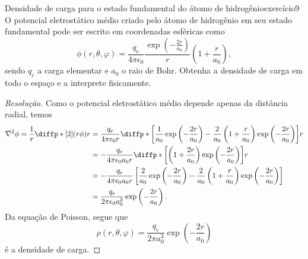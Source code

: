 \begin{exercício}{Densidade de carga para o estado fundamental do átomo de hidrogênio}{exercício9}
    O potencial eletrostático médio criado pelo átomo de hidrogênio em seu estado fundamental pode ser escrito em coordenadas esféricas como
    \begin{equation*}
        \phi(r, \theta, \varphi) = \frac{q_e}{4\pi \epsilon_0} \frac{\exp\left(-\frac{2r}{a_0}\right)}{r} \left(1 + \frac{r}{a_0}\right),
    \end{equation*}
    sendo \(q_e\) a carga elementar e \(a_0\) o raio de Bohr. Obtenha a densidade de carga em todo o espaço e a interprete fisicamente.
\end{exercício}
\begin{proof}[Resolução]
    Como o potencial eletrostático médio depende apenas da distância radial, temos
    \begin{align*}
        \nabla^2\phi = \frac{1}{r}\diffp*[2]{(r\phi)}{r}
        &= \frac{q_e}{4\pi \epsilon_0r}\diffp*{ \left[\frac{1}{a_0}\exp\left(-\frac{2r}{a_0}\right) - \frac{2}{a_0}\left(1 + \frac{r}{a_0}\right)\exp\left(-\frac{2r}{a_0}\right)\right]}{r}\\
        &= -\frac{q_e}{4\pi \epsilon_0a_0r}\diffp*{ \left[\left(1 + \frac{2r}{a_0}\right)\exp\left(-\frac{2r}{a_0}\right)\right]}{r}\\
        &= - \frac{q_e}{4\pi \epsilon_0 a_0 r}\left[\frac{2}{a_0}\exp\left(-\frac{2r}{a_0}\right) - \frac{2}{a_0}\left(1 + \frac{r}{a_0}\right)\exp\left(-\frac{2r}{a_0}\right)\right]\\
        &= \frac{q_e}{2\pi \epsilon_0 a_0^3}\exp\left(-\frac{2r}{a_0}\right).
    \end{align*}
    Da equação de Poisson, segue que
    \begin{equation*}
        \rho(r, \theta, \varphi) = \frac{q_e}{2\pi a_0^3} \exp\left(-\frac{2r}{a_0}\right)
    \end{equation*}
    é a densidade de carga.
\end{proof}
